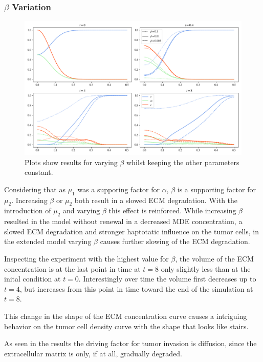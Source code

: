 \subsubsection*{$\beta$ Variation}
\begin{figure}[h!]
    \centering
    \includegraphics[width=\textwidth]{resources/images/prolif_beta_variation.png}
    \caption{Plots show results for varying $\beta$ whilst keeping the other parameters constant.}
    \label{fig:prolif_beta_variation}
\end{figure}

Considering that as $\mu_1$ was a supporing factor for $\alpha$, $\beta$ is a supporting factor for $\mu_2$. Increasing $\beta$ or $\mu_2$ both result in a slowed ECM degradation. With the introduction of $\mu_2$ and varying $\beta$ this effect is reinforced. While increasing $\beta$ resulted in the model without renewal in a decreased MDE concentration, a slowed ECM degradation and stronger haptotatic influence on the tumor cells, in the extended model varying $\beta$ causes further slowing of the ECM degradation. 

Inspecting the experiment with the highest value for $\beta$, the volume of the ECM concentration is at the last point in time at $t=8$ only slightly less than at the inital condition at $t=0$. Interestingly over time the volume first decreases up to $t=4$, but increases from this point in time toward the end of the simulation at $t=8$.

This change in the shape of the ECM concentration curve causes a intriguing behavior on the tumor cell density curve with the shape that looks like stairs.

As seen in the results the driving factor for tumor invasion is diffusion, since the extracellular matrix is only, if at all, gradually degraded.

